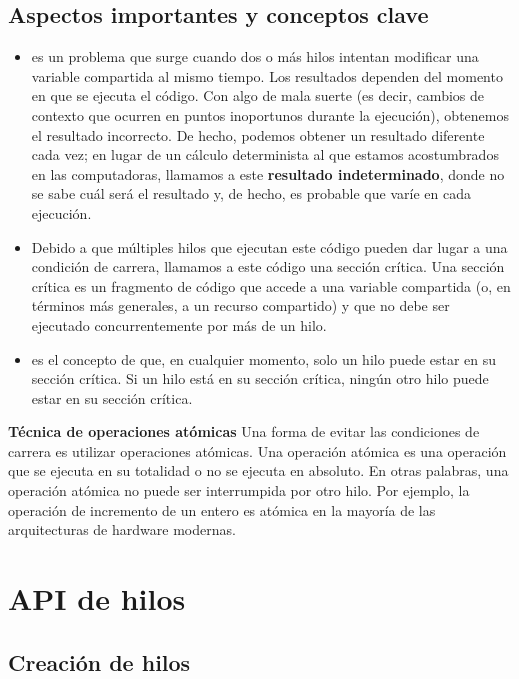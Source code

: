 \documentclass[openany]{book}
\begin{document}
\subsection{Aspectos importantes y conceptos clave}
\begin{itemize}
    \item {} es un problema que surge cuando dos o más hilos intentan modificar una variable compartida al mismo tiempo. Los resultados dependen del momento en que se ejecuta el código. Con algo de mala suerte (es decir, cambios de contexto que ocurren en puntos inoportunos durante la ejecución), obtenemos el resultado incorrecto. De hecho, podemos obtener un resultado diferente cada vez; en lugar de un cálculo determinista al que estamos acostumbrados en las computadoras, llamamos a este \textbf{resultado indeterminado}, donde no se sabe cuál será el resultado y, de hecho, es probable que varíe en cada ejecución.
    \item {} Debido a que múltiples hilos que ejecutan este código pueden dar lugar a una condición de carrera, llamamos a este código una sección crítica. Una sección crítica es un fragmento de código que accede a una variable compartida (o, en términos más generales, a un recurso compartido) y que no debe ser ejecutado concurrentemente por más de un hilo.
    \item {} es el concepto de que, en cualquier momento, solo un hilo puede estar en su sección crítica. Si un hilo está en su sección crítica, ningún otro hilo puede estar en su sección crítica.
\end{itemize}

\begin{tcolorbox}
    \textbf{Técnica de operaciones atómicas}
    \tcblower
    Una forma de evitar las condiciones de carrera es utilizar operaciones atómicas. Una operación atómica es una operación que se ejecuta en su totalidad o no se ejecuta en absoluto. En otras palabras, una operación atómica no puede ser interrumpida por otro hilo. Por ejemplo, la operación de incremento de un entero es atómica en la mayoría de las arquitecturas de hardware modernas. 
\end{tcolorbox}

\section{API de hilos}

\subsection{Creación de hilos}  
\end{document}
